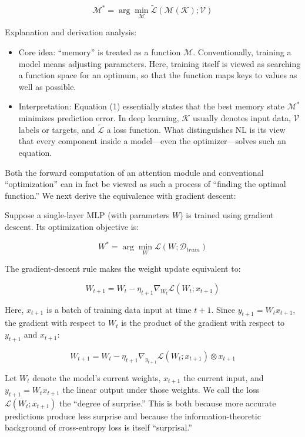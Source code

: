 \[
\mathcal{M}^*=\arg\min_{\mathcal{M}}\tilde{\mathcal{L}}(\mathcal{M}(\mathcal{K});\mathcal{V})
\tag{1}
\]

Explanation and derivation analysis:

\begin{itemize}
\tightlist
\item
  Core idea: ``memory'' is treated as a function \(\mathcal{M}\). Conventionally, training a model means adjusting parameters. Here, training itself is viewed as searching a function space for an optimum, so that the function maps keys to values as well as possible.
\item
  Interpretation: Equation (1) essentially states that the best memory state \(\mathcal{M}^*\) minimizes prediction error. In deep learning, \(\mathcal{K}\) usually denotes input data, \(\mathcal{V}\) labels or targets, and \(\tilde{\mathcal{L}}\) a loss function. What distinguishes NL is its view that every component inside a model---even the optimizer---solves such an equation.
\end{itemize}

Both the forward computation of an attention module and conventional ``optimization'' can in fact be viewed as such a process of ``finding the optimal function.'' We next derive the equivalence with gradient descent:

Suppose a single-layer MLP (with parameters \(W\)) is trained using gradient descent. Its optimization objective is:

\[
W^*=\arg\min_W\mathcal{L}(W;\mathcal{D}_{train})
\]

The gradient-descent rule makes the weight update equivalent to:

\[
W_{t+1}=W_t-\eta_{t+1}\nabla_{W_t}\mathcal{L}(W_t;x_{t+1})
\]

Here, \(x_{t+1}\) is a batch of training data input at time \(t+1\). Since \(y_{t+1}=W_tx_{t+1}\), the gradient with respect to \(W_t\) is the product of the gradient with respect to \(y_{t+1}\) and \(x_{t+1}\):

\[
W_{t+1}=W_t-\eta_{t+1}\nabla_{y_{t+1}}\mathcal{L}(W_t;x_{t+1})\otimes x_{t+1}
\tag{4}
\]

Let \(W_t\) denote the model's current weights, \(x_{t+1}\) the current input, and \(y_{t+1}=W_tx_{t+1}\) the linear output under those weights. We call the loss \(\mathcal{L}(W_t;x_{t+1})\) the ``degree of surprise.'' This is both because more accurate predictions produce less surprise and because the information-theoretic background of cross-entropy loss is itself ``surprisal.''

